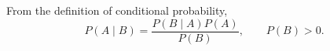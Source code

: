 From the definition of conditional probability,
\begin{equation}
\boxed{P(A\mid B)=\frac{P(B\mid A)P(A)}{P(B)}},\qquad P(B)>0.
\end{equation}
